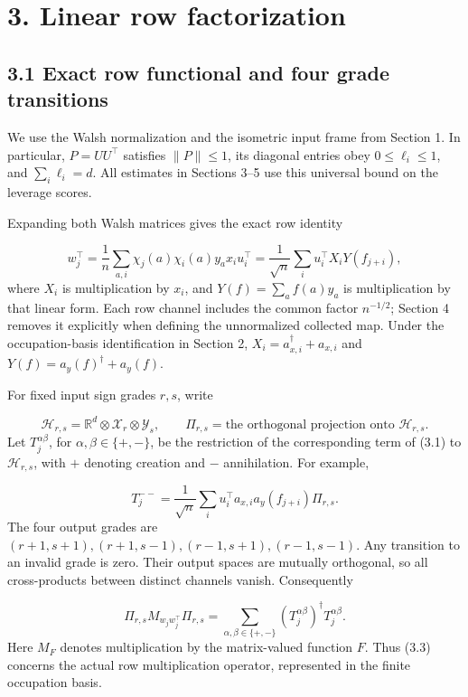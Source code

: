 \documentclass[11pt,a4paper]{article}
\begin{document}
\section*{3. Linear row factorization}
\subsection*{3.1 Exact row functional and four grade transitions}
We use the Walsh normalization and the isometric input frame from Section 1. In particular, \(P=UU^\top\) satisfies \(\|P\|\le1\), its diagonal entries obey \(0\le\ell_i\le1\), and \(\sum_i\ell_i=d\). All estimates in Sections 3--5 use this universal bound on the leverage scores.

Expanding both Walsh matrices gives the exact row identity

\begin{equation}
w_j^\top
=\frac1n\sum_{a,i}\chi_j(a)\chi_i(a)y_a x_i u_i^\top
=\frac1{\sqrt n}\sum_i u_i^\top X_iY(f_{j+i}),
\tag{3.1}
\end{equation}
where \(X_i\) is multiplication by \(x_i\), and \(Y(f)=\sum_a f(a)y_a\) is multiplication by that linear form. Each row channel includes the common factor \(n^{-1/2}\); Section 4 removes it explicitly when defining the unnormalized collected map. Under the occupation-basis identification in Section 2, \(X_i=a_{x,i}^\dagger+a_{x,i}\) and \(Y(f)=a_y(f)^\dagger+a_y(f)\).

For fixed input sign grades \(r,s\), write

\begin{equation}
\mathcal H_{r,s}=\mathbb R^d\otimes\mathcal X_r\otimes\mathcal Y_s,
\qquad \Pi_{r,s}=\text{the orthogonal projection onto }\mathcal H_{r,s}.
\tag{3.2}
\end{equation}
Let \(T_j^{\alpha\beta}\), for \(\alpha,\beta\in\{+,-\}\), be the restriction of the corresponding term of (3.1) to \(\mathcal H_{r,s}\), with \(+\) denoting creation and \(-\) annihilation. For example,

\begin{equation*}
T_j^{--}=\frac1{\sqrt n}\sum_i u_i^\top a_{x,i}a_y(f_{j+i})\Pi_{r,s}.
\end{equation*}
The four output grades are \((r+1,s+1),(r+1,s-1),(r-1,s+1),(r-1,s-1)\). Any transition to an invalid grade is zero. Their output spaces are mutually orthogonal, so all cross-products between distinct channels vanish. Consequently

\begin{equation}
\Pi_{r,s}M_{w_jw_j^\top}\Pi_{r,s}
=\sum_{\alpha,\beta\in\{+,-\}}
(T_j^{\alpha\beta})^\dagger T_j^{\alpha\beta}.
\tag{3.3}
\end{equation}
Here \(M_F\) denotes multiplication by the matrix-valued function \(F\). Thus (3.3) concerns the actual row multiplication operator, represented in the finite occupation basis.
\end{document}
